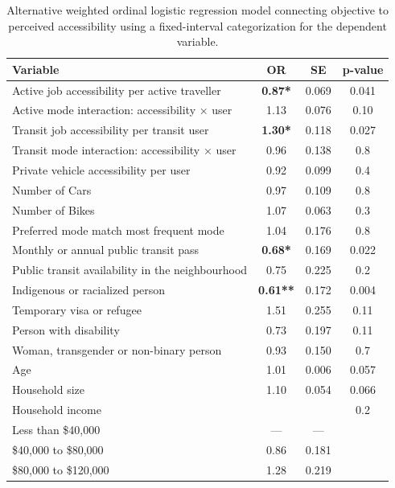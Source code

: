 \documentclass[preprint, 3p,
authoryear]{elsarticle} %
\begin{document}
\begin{table}

\caption{\label{tab:unnamed-chunk-10}\label{tab:few_jobs_break_model}Alternative weighted ordinal logistic regression model connecting objective to perceived accessibility using a fixed-interval categorization for the dependent variable.}
\centering
\begin{tabular}[t]{lccc}
\toprule
\textbf{Variable} & \textbf{OR} & \textbf{SE} & \textbf{p-value}\\
\midrule
Active job accessibility per active traveller & \textbf{0.87*} & 0.069 & 0.041\\
Active mode interaction: accessibility × user & 1.13 & 0.076 & 0.10\\
Transit job accessibility per transit user & \textbf{1.30*} & 0.118 & 0.027\\
Transit mode interaction: accessibility × user & 0.96 & 0.138 & 0.8\\
Private vehicle accessibility per user & 0.92 & 0.099 & 0.4\\
\addlinespace
Number of Cars & 0.97 & 0.109 & 0.8\\
Number of Bikes & 1.07 & 0.063 & 0.3\\
Preferred mode match most frequent mode & 1.04 & 0.176 & 0.8\\
Monthly or annual public transit pass & \textbf{0.68*} & 0.169 & 0.022\\
Public transit availability in the neighbourhood & 0.75 & 0.225 & 0.2\\
\addlinespace
Indigenous or racialized person & \textbf{0.61**} & 0.172 & 0.004\\
Temporary visa or refugee & 1.51 & 0.255 & 0.11\\
Person with disability & 0.73 & 0.197 & 0.11\\
Woman, transgender or non-binary person & 0.93 & 0.150 & 0.7\\
Age & 1.01 & 0.006 & 0.057\\
\addlinespace
Household size & 1.10 & 0.054 & 0.066\\
Household income &  &  & 0.2\\
\hspace{1em}Less than \$40,000 & — & — & \\
\hspace{1em}\$40,000 to \$80,000 & 0.86 & 0.181 & \\
\hspace{1em}\$80,000 to \$120,000 & 1.28 & 0.219 & \\

\end{tabular}
\end{table}
\end{document}
